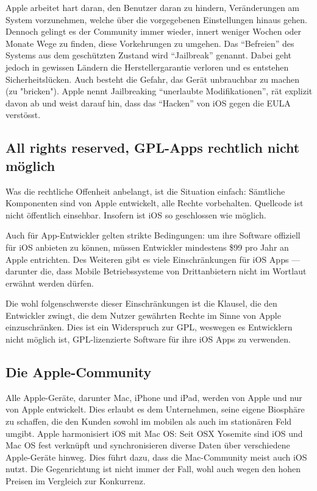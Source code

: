 Apple arbeitet hart daran, den Benutzer daran zu hindern, Veränderungen am System vorzunehmen, welche über die vorgegebenen Einstellungen hinaus gehen. Dennoch gelingt es der Community immer wieder, innert weniger Wochen oder Monate Wege zu finden, diese Vorkehrungen zu umgehen. Das ``Befreien'' des Systems aus dem geschützten Zustand wird ``Jailbreak'' genannt\thinspace\cite{online:ios-jailbreak}. Dabei geht jedoch in gewissen Ländern die Herstellergarantie verloren und es entstehen Sicherheitslücken. Auch besteht die Gefahr, das Gerät unbrauchbar zu machen (zu "bricken")\thinspace\cite{online:ios-whyjailbreak}. Apple nennt Jailbreaking ``unerlaubte Modifikationen'', rät explizit davon ab und weist darauf hin, dass das ``Hacken'' von iOS gegen die EULA verstösst\thinspace\cite{online:ios-dontjailbreak}.
\newline

\subsection{All rights reserved, GPL-Apps rechtlich nicht möglich}
Was die rechtliche Offenheit anbelangt, ist die Situation einfach: Sämtliche Komponenten sind von Apple entwickelt, alle Rechte vorbehalten. Quellcode ist nicht öffentlich einsehbar. Insofern ist iOS so geschlossen wie möglich.

Auch für \mbox{App-Entwickler} gelten strikte Bedingungen: um ihre Software offiziell für iOS anbieten zu können, müssen Entwickler mindestens \$99 pro Jahr an Apple entrichten\thinspace\cite{online:ios-appstore}. Des Weiteren gibt es viele Einschränkungen für iOS Apps --- darunter die, dass Mobile Betriebssysteme von Drittanbietern nicht im Wortlaut erwähnt werden dürfen\thinspace\cite{online:ios-guidelines}.

Die wohl folgenschwerste dieser Einschränkungen ist die Klausel, die den Entwickler zwingt, die dem Nutzer gewährten Rechte im Sinne von Apple einzuschränken\thinspace\cite{online:ios-terms}. Dies ist ein Widerspruch zur GPL, weswegen es Entwicklern nicht möglich ist, \mbox{GPL-lizenzierte} Software für ihre iOS Apps zu verwenden\thinspace\cite{online:ios-gpl}.
\newline

\subsection{Die Apple-Community}
Alle Apple-Geräte, darunter Mac, iPhone und iPad, werden von Apple und nur von Apple entwickelt. Dies erlaubt es dem Unternehmen, seine eigene Biosphäre zu schaffen, die den Kunden sowohl im mobilen als auch im stationären Feld umgibt. Apple harmonisiert iOS mit Mac OS: Seit OS\thinspace X Yosemite sind iOS und Mac OS fest verknüpft und synchronisieren diverse Daten über verschiedene \mbox{Apple-Geräte} hinweg. Dies führt dazu, dass die \mbox{Mac-Community} meist auch iOS nutzt. Die Gegenrichtung ist nicht immer der Fall, wohl auch wegen den hohen Preisen im Vergleich zur Konkurrenz.


